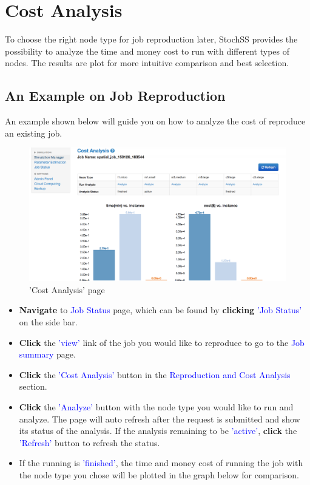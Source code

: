 \documentclass[12pt,notitlepage,nofootinbib]{revtex4}
\begin{document}
\newpage

\section{Cost Analysis}
To choose the right node type for job reproduction later, StochSS provides the possibility to analyze the time and money cost to run with different types of nodes. The results are plot for more intuitive comparison and best selection.

\subsection{An Example on Job Reproduction}
An example shown below will guide you on how to analyze the cost of reproduce an existing job.

\begin{figure}[!ht]
\centering
\includegraphics[scale=0.35]{T6_fig_costanalysis.png}
\caption{'Cost Analysis' page}
\label{fig:2}
\end{figure}

\begin{itemize}
\item \textbf{Navigate} to \textcolor{blue}{Job Status} page, which can be found by \textbf{clicking} \textcolor{blue}{'Job Status'} on the side bar.
\item \textbf{Click} the \textcolor{blue}{'view'} link of the job you would like to reproduce to go to the \textcolor{blue}{Job summary} page.
\item \textbf{Click} the \textcolor{blue}{'Cost Analysis'} button in the \textcolor{blue}{Reproduction and Cost Analysis} section.
\item \textbf{Click} the \textcolor{blue}{'Analyze'} button with the node type you would like to run and analyze. The page will auto refresh after the request is submitted and show its status of the analysis. If the analysis remaining to be \textcolor{blue}{'active'}, \textbf{click} the \textcolor{blue}{'Refresh'} button to refresh the status.
\item If the running is \textcolor{blue}{'finished'}, the time and money cost of running the job with the node type you chose will be plotted in the graph below for comparison.
\end{itemize}
\end{document}

